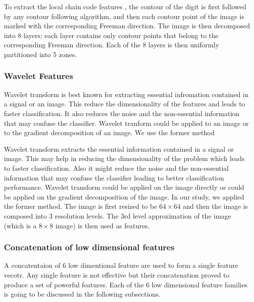 \documentclass[conference]{IEEEtran}
\begin{document}
To extract the local chain code features \cite{Zhang2004}, the contour of the digit is first followed by any contour following algorithm, and then each contour point of the image is marked with the corresponding Freeman direction. The image is then decomposed into 8 layers; each layer contains only contour points that belong to the corresponding Freeman direction. Each of the 8 layers is then uniformly partitioned into 5 zones.


\subsubsection {Wavelet Features}

Wavelet transform \cite{gonzales2002} is best known for extracting essential infromation contained in a signal or an image. This reduce the dimensionality of the features and leads to faster classification. It also reduces the noise and the non-essential information that may confuse the classifier.  Wavelet tranform could be applied to an image or to the gradient decomposition of an image.  We use the former method

Wavelet transform \cite{gonzales2002} extracts the essential information contained in a signal or image. This may help in reducing the dimensionality of the problem which leads to faster classification. Also it might reduce the noise and the non-essential information that may confuse the classifier leading to better classification performance. Wavelet transform could be applied on the image directly or could be applied on the gradient decomposition of the image. In our study, we applied the former method. The image is first resized to be $64\times64$ and then the image is composed into 3 resolution levels. The 3rd level approximation of the image (which is a $8\times8$ image) is then used as features.


\subsubsection {Concatenation of low dimensional features}
\label{sec:conLow}
A concatentaion of 6 low dimentional feature are used to form a single feature vecotr. Any single feature is not effective but their concatenation proved to produce a set of  powerful features.   Each of the 6 low dimensional feature families is going to be discussed in the following subsections.
\end{document}
